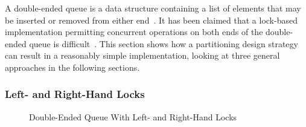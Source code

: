 A double-ended queue is a data structure containing a list of elements
that may be inserted or removed from either end~\cite{Knuth73}.
It has been claimed that a lock-based implementation permitting
concurrent operations on both ends of the double-ended queue is
difficult~\cite{DanGrossman2007TMGCAnalogy}.
This section shows how a partitioning design strategy can result
in a reasonably simple implementation, looking at three
general approaches in the following sections.
\fi

\subsubsection{Left- and Right-Hand Locks}
\label{sec:SMPdesign:Left- and Right-Hand Locks}

\begin{figure}[tb]
\begin{center}
\end{center}
\caption{Double-Ended Queue With Left- and Right-Hand Locks}
\label{fig:SMPdesign:Double-Ended Queue With Left- and Right-Hand Locks}
\end{figure}

